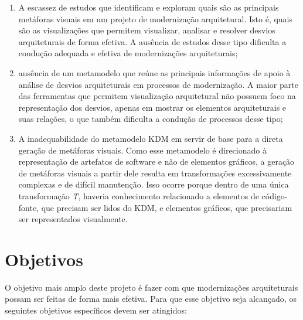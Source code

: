 \documentclass[12pt]{article}
\begin{document}
\begin{enumerate}

\item A escassez de estudos que identificam e exploram quais são as principais metáforas visuais em um projeto de modernização arquitetural. Isto é, quais são as visualizações que permitem visualizar, analisar e resolver desvios arquiteturais de forma efetiva. A ausência de estudos desse tipo dificulta a condução adequada e efetiva de modernizações arquiteturais;

\item ausência de um metamodelo que reúne as principais informações de apoio à análise de desvios arquiteturais em processos de modernização. A maior parte das ferramentas que permitem visualização arquitetural não possuem foco na representação dos desvios, apenas em mostrar os elementos arquiteturais e suas relações, o que também dificulta a condução de processos desse tipo;

\item A inadequabilidade do metamodelo KDM em servir de base para a direta geração de metáforas visuais. Como esse metamodelo é direcionado à representação de artefatos de software e não de elementos gráficos, a geração de metáforas visuais a partir dele resulta em transformações excessivamente complexas e de difícil manutenção. Isso ocorre porque dentro de uma única transformação \textit{T}, haveria conhecimento relacionado a elementos de código-fonte, que precisam ser lidos do KDM, e elementos gráficos, que precisariam ser representados visualmente.
\end{enumerate}
 

\section{Objetivos}

O objetivo mais amplo deste projeto é fazer com que modernizações arquiteturais possam ser feitas de forma mais efetiva. Para que esse objetivo seja alcançado, os seguintes objetivos específicos devem ser atingidos:
\end{document}
